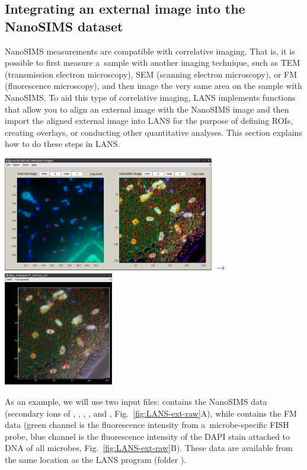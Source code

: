 \subsection{Integrating an external image into the NanoSIMS dataset}
\setcounter{step}{0}

\goldbox{}
NanoSIMS measurements are compatible with correlative imaging. That is, it is possible to first measure a~sample with another imaging technique, such as TEM (transmission electron microscopy), SEM (scanning electron microscopy), or FM (fluorescence microscopy), and then image the very same area on the sample with NanoSIMS. To aid this type of correlative imaging, LANS implements functions that allow you to align an external image with the NanoSIMS image and then import the aligned external image into LANS for the purpose of defining ROIs, creating overlays, or conducting other quantitative analyses. This section explains how to do these steps in LANS.
\begin{center}
\includegraphics[height=5cm, valign=c]{figs7/LANS-ext-align-points}
$\rightarrow$
\includegraphics[height=5cm, valign=c]{figs7/LANS-ext-result1}
\end{center}
\tcbe

As an example, we will use two input files:  contains the NanoSIMS data (secondary ions of , , , ,  and , Fig.~\ref{fig:LANS-ext-raw}A), while  contains the FM data (green channel is the fluorescence intensity from a~microbe-specific FISH probe, blue channel is the fluorescence intensity of the DAPI stain attached to DNA of all microbes, Fig.~\ref{fig:LANS-ext-raw}B). These data are available from the same location as the LANS program (folder ).

